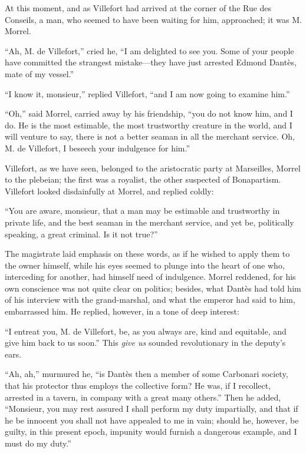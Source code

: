 At this moment, and as Villefort had arrived at the corner of the Rue
des Conseils, a man, who seemed to have been waiting for him,
approached; it was M. Morrel.

“Ah, M. de Villefort,” cried he, “I am delighted to see you. Some of
your people have committed the strangest mistake—they have just
arrested Edmond Dantès, mate of my vessel.”

“I know it, monsieur,” replied Villefort, “and I am now going to
examine him.”

“Oh,” said Morrel, carried away by his friendship, “you do not know
him, and I do. He is the most estimable, the most trustworthy creature
in the world, and I will venture to say, there is not a better seaman
in all the merchant service. Oh, M. de Villefort, I beseech your
indulgence for him.”

Villefort, as we have seen, belonged to the aristocratic party at
Marseilles, Morrel to the plebeian; the first was a royalist, the other
suspected of Bonapartism. Villefort looked disdainfully at Morrel, and
replied coldly:

“You are aware, monsieur, that a man may be estimable and trustworthy
in private life, and the best seaman in the merchant service, and yet
be, politically speaking, a great criminal. Is it not true?”

The magistrate laid emphasis on these words, as if he wished to apply
them to the owner himself, while his eyes seemed to plunge into the
heart of one who, interceding for another, had himself need of
indulgence. Morrel reddened, for his own conscience was not quite clear
on politics; besides, what Dantès had told him of his interview with
the grand-marshal, and what the emperor had said to him, embarrassed
him. He replied, however, in a tone of deep interest:

“I entreat you, M. de Villefort, be, as you always are, kind and
equitable, and give him back to us soon.” This \textit{give us} sounded
revolutionary in the deputy’s ears.

“Ah, ah,” murmured he, “is Dantès then a member of some Carbonari
society, that his protector thus employs the collective form? He was,
if I recollect, arrested in a tavern, in company with a great many
others.” Then he added, “Monsieur, you may rest assured I shall perform
my duty impartially, and that if he be innocent you shall not have
appealed to me in vain; should he, however, be guilty, in this present
epoch, impunity would furnish a dangerous example, and I must do my
duty.”

